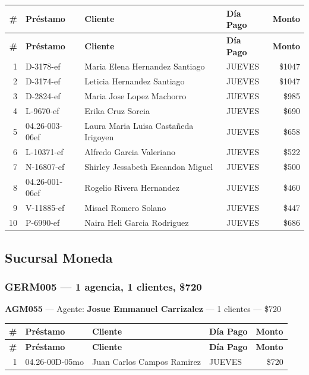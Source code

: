 \documentclass[11pt,a4paper]{article}
\newcommand{\money}[1]{\$\num{#1}}
\begin{document}
\begin{center}
\renewcommand{\arraystretch}{1.1}
\footnotesize
\begin{longtable}{rlp{6.5cm}lr}
\toprule
\textbf{\#} & \textbf{Pr\'estamo} & \textbf{Cliente} & \textbf{D\'ia Pago} & \textbf{Monto} \\
\midrule
\endfirsthead
\toprule
\textbf{\#} & \textbf{Pr\'estamo} & \textbf{Cliente} & \textbf{D\'ia Pago} & \textbf{Monto} \\
\midrule
\endhead
1 & D-3178-ef & Maria Elena Hernandez Santiago & JUEVES & \money{1047} \\
2 & D-3174-ef & Leticia Hernandez Santiago & JUEVES & \money{1047} \\
3 & D-2824-ef & Maria Jose Lopez Machorro & JUEVES & \money{985} \\
4 & L-9670-ef & Erika Cruz Sorcia & JUEVES & \money{690} \\
5 & 04.26-003-06ef & Laura Maria Luisa Castañeda Irigoyen & JUEVES & \money{658} \\
6 & L-10371-ef & Alfredo Garcia Valeriano & JUEVES & \money{522} \\
7 & N-16807-ef & Shirley Jessabeth Escandon Miguel & JUEVES & \money{500} \\
8 & 04.26-001-06ef & Rogelio Rivera Hernandez & JUEVES & \money{460} \\
9 & V-11885-ef & Misael Romero Solano & JUEVES & \money{447} \\
10 & P-6990-ef & Naira Heli Garcia Rodriguez & JUEVES & \money{686} \\

\bottomrule
\end{longtable}
\end{center}
\newpage
\subsection{Sucursal Moneda}

\subsubsection{GERM005 --- 1 agencia, 1 clientes, \money{720}}

\noindent\textbf{AGM055} --- Agente: \textbf{Josue Emmanuel Carrizalez} --- 1 clientes --- \money{720}


\begin{center}
\renewcommand{\arraystretch}{1.1}
\footnotesize
\begin{longtable}{rlp{6.5cm}lr}
\toprule
\textbf{\#} & \textbf{Pr\'estamo} & \textbf{Cliente} & \textbf{D\'ia Pago} & \textbf{Monto} \\
\midrule
\endfirsthead
\toprule
\textbf{\#} & \textbf{Pr\'estamo} & \textbf{Cliente} & \textbf{D\'ia Pago} & \textbf{Monto} \\
\midrule
\endhead
1 & 04.26-00D-05mo & Juan Carlos Campos Ramirez & JUEVES & \money{720} \\

\bottomrule
\end{longtable}
\end{center}
\newpage
\end{document}
